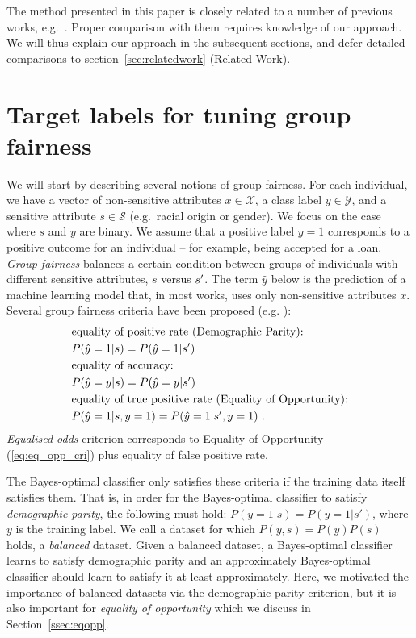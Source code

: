 The method presented in this paper is closely related to a number of previous works,
e.g.\ \citet{kamiran2012data,calders2010three}.
Proper comparison with them requires knowledge of our approach.
We will thus explain our approach in the subsequent sections, and defer detailed comparisons to section~\ref{sec:relatedwork} (Related Work).

\section{Target labels for tuning group fairness}
We will start by describing several notions of group fairness.
For each individual, we have a vector of non-sensitive attributes $x\in\mathcal{X}$, a class label $y\in\mathcal{Y}$, and a sensitive attribute $s\in\mathcal{S}$ (e.g.\ racial origin or gender).
%
We focus on the case where $s$ and $y$ are binary. 
%
We assume that a positive label $y=1$ corresponds to a positive outcome for an individual -- for example, being accepted for a loan.
%
%
\emph{Group fairness} balances a certain condition between groups of individuals with different sensitive attributes, $s$ versus $s\sp{\prime}$. 
%
The term $\hat{y}$ below is the prediction of a machine learning model that,
in most works, uses only non-sensitive attributes $x$.
%
Several group fairness criteria have been proposed (e.g. \cite{zafar2017fairnesstreatment,chouldechova2017fair,hardt2016equality}):
\begin{align}
& \text{equality of positive rate (Demographic Parity):}\nonumber\\
& P(\hat{y}=1|s)=P(\hat{y}=1|s\sp{\prime}) \label{eq:eq_dem_par}\\
& \text{equality of accuracy:}\nonumber\\
& P(\hat{y}=y|s)=P(\hat{y}=y|s\sp{\prime}) \\
& \text{equality of true positive rate (Equality of Opportunity):} \nonumber\\
& P(\hat{y}=1|s,y=1)=P(\hat{y}=1|s\sp{\prime},y=1)  \label{eq:eq_opp_cri}~.
\end{align}
\emph{Equalised odds} criterion corresponds to Equality of Opportunity (\ref{eq:eq_opp_cri}) plus equality of false positive rate.

The Bayes-optimal classifier only satisfies these criteria if the training data itself satisfies them.
That is, in order for the Bayes-optimal classifier to satisfy \emph{demographic parity}, the following must hold:
$P(y=1|s) = P(y=1|s\prime)$, where $y$ is the training label.
We call a dataset for which $P(y, s)=P(y)P(s)$ holds, a \emph{balanced} dataset.
Given a balanced dataset, a Bayes-optimal classifier learns to satisfy demographic parity
and an approximately Bayes-optimal classifier should learn to satisfy it at least approximately.
Here, we motivated the importance of balanced datasets via the demographic parity criterion,
but it is also important for \emph{equality of opportunity} which we discuss in Section~\ref{ssec:eqopp}.

